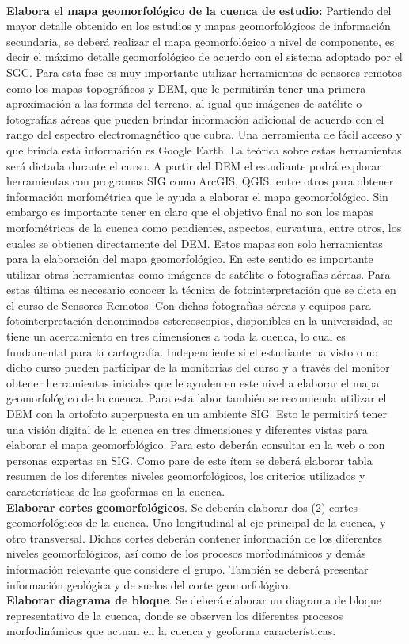 \documentclass[twoside,11pt,]{article}
\begin{document}
\\
\textbf{Elabora el mapa geomorfológico de la cuenca de estudio:} Partiendo del mayor detalle obtenido en los estudios y mapas geomorfológicos de información secundaria, se deberá realizar el mapa geomorfológico a nivel de componente, es decir el máximo detalle geomorfológico de acuerdo con el sistema adoptado por el SGC. Para esta fase es muy importante utilizar herramientas de sensores remotos como los mapas topográficos y DEM, que le permitirán tener una primera aproximación a las formas del terreno, al igual que imágenes de satélite o fotografías aéreas que pueden brindar información adicional de acuerdo con el rango del espectro electromagnético que cubra. Una herramienta de fácil acceso y que brinda esta información es Google Earth. La teórica sobre estas herramientas será dictada durante el curso.
A partir del DEM el estudiante podrá explorar herramientas con programas SIG como ArcGIS, QGIS, entre otros para obtener información morfométrica que le ayuda a elaborar el mapa geomorfológico. Sin embargo es importante tener en claro que el objetivo final no son los mapas morfométricos de la cuenca como pendientes, aspectos, curvatura, entre otros, los cuales se obtienen directamente del DEM. Estos mapas son solo herramientas para la elaboración del mapa geomorfológico.
En este sentido es importante utilizar otras herramientas como imágenes de satélite o fotografías aéreas. Para estas última es necesario conocer la técnica de fotointerpretación que se dicta en el curso de Sensores Remotos. Con dichas fotografías aéreas y equipos para fotointerpretación denominados estereoscopios, disponibles en la universidad, se tiene un acercamiento en tres dimensiones a toda la cuenca, lo cual es fundamental para la cartografía. Independiente si el estudiante ha visto o no dicho curso pueden participar de la monitorias del curso y a través del monitor obtener herramientas iniciales que le ayuden en este nivel a elaborar el mapa geomorfológico de la cuenca. Para esta labor también se recomienda utilizar el DEM con la ortofoto superpuesta en un ambiente SIG. Esto le permitirá tener una visión digital de la cuenca en tres dimensiones y diferentes vistas para elaborar el mapa geomorfológico. Para esto deberán consultar en la web o con personas expertas en SIG. 
Como pare de este ítem se deberá elaborar tabla resumen de los diferentes niveles geomorfológicos, los criterios utilizados y características de las geoformas en la cuenca.
\\
\textbf{Elaborar cortes geomorfológicos}. Se deberán elaborar dos (2) cortes geomorfológicos de la cuenca. Uno longitudinal al eje principal de la cuenca, y otro transversal. Dichos cortes deberán contener información de los diferentes niveles geomorfológicos, así como de los procesos morfodinámicos y demás información relevante que considere el grupo. También se deberá presentar información geológica y de suelos del corte geomorfológico.
\\
\textbf{Elaborar diagrama de bloque}. Se deberá elaborar un diagrama de bloque representativo de la cuenca, donde se observen los diferentes procesos morfodinámicos que actuan en la cuenca y geoforma características.
\end{document}
